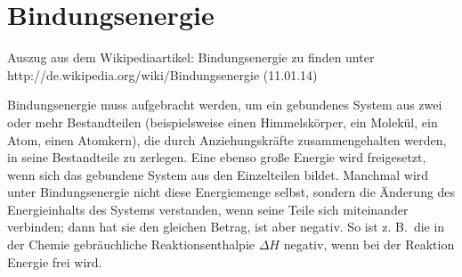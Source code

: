 \documentclass[12pt,a4paper,twoside]{article}
\begin{document}
\newpage

\newcommand{\LS}[2]{
\pgfmathsetmacro{\Datum}{0.1*(#1-1814)};
\draw (\Datum,-0.1) -- (\Datum,0.1) node [left] {#2};
}

\newcommand{\RS}[2]{
\pgfmathsetmacro{\Datum}{0.1*(#1-1814)};
\draw (\Datum,0.1) -- (\Datum,-0.1) node [right] {#2};
}



\newpage

\section*{Bindungsenergie}

Auszug aus dem Wikipediaartikel: Bindungsenergie zu finden unter \\
http://de.wikipedia.org/wiki/Bindungsenergie (11.01.14)

Bindungsenergie muss aufgebracht werden, um ein gebundenes System aus zwei oder mehr Bestandteilen 
(beispielsweise einen Himmelskörper, ein Molekül, ein Atom, einen Atomkern), die durch Anziehungskräfte 
zusammengehalten werden, in seine Bestandteile zu zerlegen. Eine ebenso große Energie wird freigesetzt, 
wenn sich das gebundene System aus den Einzelteilen bildet. Manchmal wird unter Bindungsenergie nicht diese 
Energiemenge selbst, sondern die Änderung des Energieinhalts des Systems verstanden, wenn seine Teile sich 
miteinander verbinden; dann hat sie den gleichen Betrag, ist aber negativ. So ist z. B.\ die in der Chemie 
gebräuchliche Reaktionsenthalpie $\Delta H$ negativ, wenn bei der Reaktion Energie frei wird.
\end{document}
